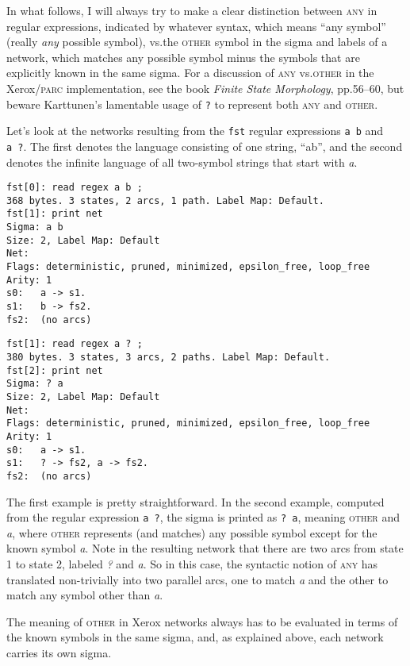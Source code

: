 \documentclass[letterpaper,11pt]{article}
\providecommand{\acro}{}\renewcommand{\acro}{\textsc}
\begin{document}
In what follows, I will always try to make a
clear distinction between \acro{any} in regular expressions, indicated by whatever syntax, 
which means ``any symbol'' (really \emph{any} possible symbol), vs.\@ the
\acro{other} symbol
in the sigma and labels of a network, which matches any possible symbol minus the
symbols that are explicitly
known in the same sigma.  For a discussion of \acro{any} vs.\@ \acro{other} in the Xerox/\acro{parc}
implementation, see the book \emph{Finite State Morphology}, pp.\@ 56--60, but beware
Karttunen's lamentable usage of \texttt{?} to represent both \acro{any} and \acro{other}.

Let's look at the networks
resulting from the \texttt{fst} regular
expressions \texttt{a~b}
and \texttt{a~?}.  The first denotes the language consisting of one string,
``ab'', and the second denotes the infinite language of all two-symbol strings that start with
\emph{a}.

\begin{Verbatim}[fontsize=\footnotesize]
fst[0]: read regex a b ;
368 bytes. 3 states, 2 arcs, 1 path. Label Map: Default.
fst[1]: print net
Sigma: a b
Size: 2, Label Map: Default
Net: 
Flags: deterministic, pruned, minimized, epsilon_free, loop_free
Arity: 1
s0:   a -> s1.
s1:   b -> fs2.
fs2:  (no arcs)
\end{Verbatim}

\begin{Verbatim}[fontsize=\footnotesize]
fst[1]: read regex a ? ;
380 bytes. 3 states, 3 arcs, 2 paths. Label Map: Default.
fst[2]: print net
Sigma: ? a
Size: 2, Label Map: Default
Net: 
Flags: deterministic, pruned, minimized, epsilon_free, loop_free
Arity: 1
s0:   a -> s1.
s1:   ? -> fs2, a -> fs2.
fs2:  (no arcs)
\end{Verbatim}

\noindent
The first example is pretty straightforward.  In the second example,
computed from the regular expression \texttt{a~?}, the sigma is printed
as \texttt{?~a}, meaning \acro{other} and
\emph{a}, where \acro{other} represents (and matches) any possible
symbol 
except for the known symbol \emph{a}.  Note in
the resulting network that there are two arcs from state 1 to state
2, labeled \emph{?} and \emph{a}.  So in this case, the syntactic
notion of \acro{any} has translated non-trivially into two parallel
arcs, one to match \emph{a} and the other to match any symbol
other than \emph{a}.  

The meaning of \acro{other} in Xerox networks always has to be
evaluated in terms of the known symbols in the same sigma, and, as explained above, each network carries its own sigma.
\end{document}
